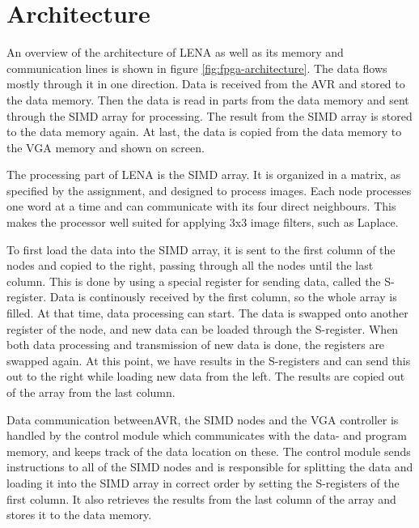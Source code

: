 \section{Architecture}




An overview of the architecture of \ac{LENA} as well as its memory and communication
lines is shown in figure \ref{fig:fpga-architecture}. The data flows mostly
through it in one direction. Data is received from the AVR and stored to the
data memory. Then the data is read in parts from the data memory and sent
through the \ac{SIMD} array for processing. The result from the \ac{SIMD} array is stored
to the data memory again. At last, the data is copied from the data memory to
the \ac{VGA} memory and shown on screen.

The processing part of \ac{LENA} is the \ac{SIMD} array. It is organized in a matrix, as
specified by the assignment, and designed to process images. Each node processes
one word at a time and can communicate with its four direct neighbours. This
makes the processor well suited for applying 3x3 image filters, such as Laplace.

To first load the data into the \ac{SIMD} array, it is sent to the first column of
the nodes and copied to the right, passing through all the nodes until the last
column.  This is done by using a special register for sending data, called the
S-register. Data is continously received by the first column, so the whole array
is filled. At that time, data processing can start. The data is swapped onto
another register of the node, and new data can be loaded through the S-register.
When both data processing and transmission of new data is done, the registers
are swapped again. At this point, we have results in the S-registers and can
send this out to the right while loading new data from the left. The results are
copied out of the array from the last column.

Data communication between\ac{AVR}, the \ac{SIMD} nodes and the \ac{VGA}
controller is handled by the control module which communicates with the data-
and program memory, and keeps track of the data location on these. The control
module sends instructions to all of the \ac{SIMD} nodes and is responsible for
splitting the data and loading it into the \ac{SIMD} array in correct order by
setting the S-registers of the first column. It also retrieves the results from
the last column of the array and stores it to the data memory.

